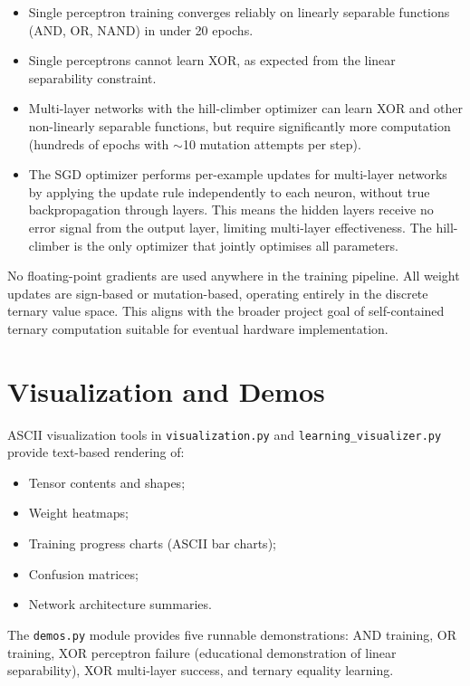 \documentclass[10pt,a4paper,twoside]{book}
\begin{document}
\begin{itemize}
    \item Single perceptron training converges reliably on linearly
          separable functions (AND, OR, NAND) in under 20 epochs.
    \item Single perceptrons cannot learn XOR, as expected from the
          linear separability constraint.
    \item Multi-layer networks with the hill-climber optimizer can learn
          XOR and other non-linearly separable functions, but require
          significantly more computation (hundreds of epochs with
          $\sim$10 mutation attempts per step).
    \item The SGD optimizer performs per-example updates for multi-layer
          networks by applying the update rule independently to each
          neuron, without true backpropagation through layers. This
          means the hidden layers receive no error signal from the
          output layer, limiting multi-layer effectiveness. The
          hill-climber is the only optimizer that jointly optimises all
          parameters.
\end{itemize}

No floating-point gradients are used anywhere in the training pipeline.
All weight updates are sign-based or mutation-based, operating entirely
in the discrete ternary value space. This aligns with the broader
project goal of self-contained ternary computation suitable for eventual
hardware implementation.

\section{Visualization and Demos}

ASCII visualization tools in \texttt{visualization.py} and
\texttt{learning\_visualizer.py} provide text-based rendering of:
\begin{itemize}
    \item Tensor contents and shapes;
    \item Weight heatmaps;
    \item Training progress charts (ASCII bar charts);
    \item Confusion matrices;
    \item Network architecture summaries.
\end{itemize}

The \texttt{demos.py} module provides five runnable demonstrations:
AND training, OR training, XOR perceptron failure (educational
demonstration of linear separability), XOR multi-layer success, and
ternary equality learning.
\end{document}
